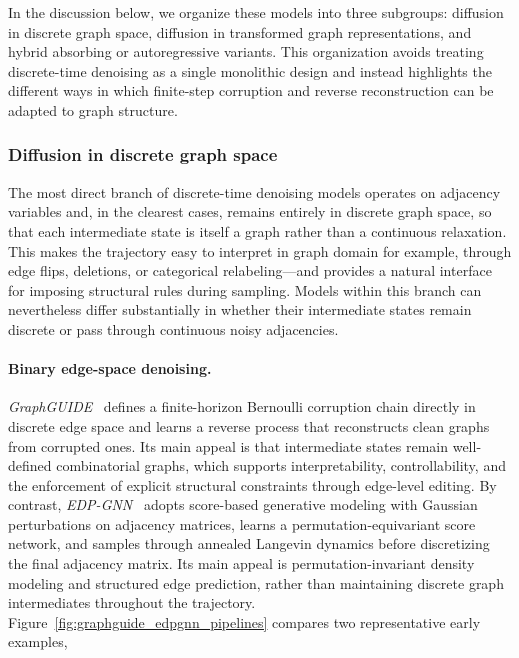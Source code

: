 \documentclass{article}
\begin{document}
In the discussion below, we organize these models into three subgroups: diffusion in discrete graph space, diffusion in transformed graph representations, and hybrid absorbing or autoregressive variants. This organization avoids treating discrete-time denoising as a single monolithic design and instead highlights the different ways in which finite-step corruption and reverse reconstruction can be adapted to graph structure.

\subsubsection{Diffusion in discrete graph space}
\label{sec:direct_discrete_diffusion}



The most direct branch of discrete-time denoising models operates on adjacency variables and, in the clearest cases, remains entirely in discrete graph space, so that each intermediate state is itself a graph rather than a continuous relaxation. This makes the trajectory easy to interpret in graph domain for example, through edge flips, deletions, or categorical relabeling---and provides a natural interface for imposing structural rules during sampling. Models within this branch can nevertheless differ substantially in whether their intermediate states remain discrete or pass through continuous noisy adjacencies.



\paragraph{Binary edge-space denoising.}
\emph{GraphGUIDE}~\cite{tseng2023graphguide} defines a finite-horizon Bernoulli corruption chain directly in discrete edge space and learns a reverse process that reconstructs clean graphs from corrupted ones. Its main appeal is that intermediate states remain well-defined combinatorial graphs, which supports interpretability, controllability, and the enforcement of explicit structural constraints through edge-level editing. By contrast, \emph{EDP-GNN}~\cite{niu2020permutation} adopts score-based generative modeling with Gaussian perturbations on adjacency matrices, learns a permutation-equivariant score network, and samples through annealed Langevin dynamics before discretizing the final adjacency matrix. Its main appeal is permutation-invariant density modeling and structured edge prediction, rather than maintaining discrete graph intermediates throughout the trajectory. Figure~\ref{fig:graphguide_edpgnn_pipelines} compares two representative early examples,
\end{document}
